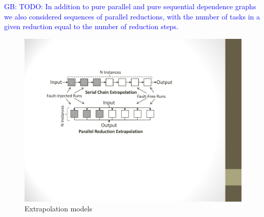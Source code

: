 \documentclass[10pt, conference, compsocconf]{IEEEtran}
\newcommand{\greg}[1]{%
  \textcolor{blue}{GB: #1}
}
\begin{document}
\greg{TODO: In addition to pure parallel and pure sequential dependence graphs we also considered sequences of parallel reductions, with the number of tasks in a given reduction equal to the number of reduction steps.}

\begin{figure}[ht!]
\centering
\includegraphics[width=1.00\columnwidth]{figs/extrapolates.pdf}
\caption{Extrapolation models}
\label{fig:extrapolations}
\end{figure}
\end{document}
